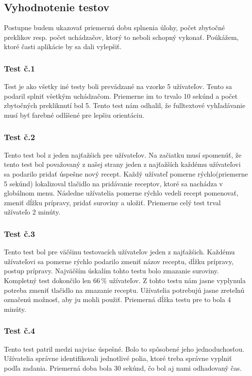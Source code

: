 \documentclass[12pt,a4paper,titlepage,final]{article}
\begin{document}
\subsection{Vyhodnotenie testov}
Postupne budem ukazovať priemernú dobu splnenia úlohy, počet zbytočné preklikov resp. počet uchádzačov, ktorý to neboli schopný vykonať. Poúkážem, ktoré časti aplikácie by sa dali vylepšiť.

\subsubsection{Test č.1}
Test je ako všetky iné testy boli prevádzané na vzorke 5 užívateľov. Tento sa podaril splniť všetkým uchádzačom. Priemerne im to trvalo 10 sekúnd a počet zbytočných prekliknutí bol 5. Tento test nám odhalil, že fulltextové vyhľadávanie musí byť farebné odlíšené pre lepšiu orientáciu.

\subsubsection{Test č.2}
Tento test bol z jeden najťažśich pre užívateľov. Na začiatku musí spomenúť, že tento test bol považovaný  z našej strany jeden z najťažších každému užívateľovi sa podarilo pridať úspešne nový recept. Každý užívateľ pomerne rýchlo(priemerne 5 sekúnd) lokalizoval tlačidlo na pridávanie receptov, ktoré sa nachádza v globálnom menu. Následne užívatelia pomerne rýchlo vedeli recept pomenovať, zmeniť dĺžku prípravy, pridať suroviny a uložiť. Priemerne celý test trval užívateľo 2 minúty.


\subsubsection{Test č.3}
Tento test bol pre väčšinu testovacích užívateľov jeden z najťažśich. Každému užívateľovi sa pomerne rýchlo podarilo zmeniť názov receptu, dĺžku prípravy, postup prípravy. Najväčším úskalím tohto testu bolo zmazanie suroviny. Kompletný test dokončilo len 66\,\% užívateľov.
Z tohto testu nám jasne vyplynula potreba zmeniť tlačidlo na zmazanie receptu. Užívatelia potrebujú jasne zreteľnú označenú možnosť, aby ju mohli použiť. Priemerná dĺžka testu pre to bola 4 minúty.

\subsubsection{Test č.4} 
Tento test patril medzi najviac úspešné. Bolo to spôsobené jeho jednoduchosťou. Užívatelia správne identifikovali jednotlivé polia, ktoré treba správne vyplniť podľa zadania. Priemerná doba bola 30 sekúnd, čo bol aj nami odhadovaný čas.
\end{document}
